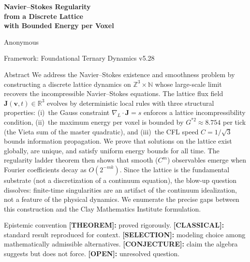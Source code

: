 \documentclass[11pt]{article}
\theoremstyle{tight}
\theoremstyle{plainroman}
\newcommand{\R}{\mathbb{R}}
\newcommand{\Z}{\mathbb{Z}}
\newcommand{\N}{\mathbb{N}}
\begin{document}
\begin{titlepage}
\centering
\vspace*{1.8cm}
{\fontsize{21}{26}\selectfont\bfseries\color{accent}
Navier--Stokes Regularity\\[0.3em]
from a Discrete Lattice\\[0.3em]
with Bounded Energy per Voxel\par}
\vspace{0.8cm}
{\large Anonymous\par}
\vspace{0.3cm}
{\normalsize Framework: Foundational Ternary Dynamics v5.28\par}
\vspace{1.2cm}
\begin{minipage}{0.86\textwidth}
\begin{statusbox}{Abstract}
We address the Navier--Stokes existence and smoothness problem by constructing a discrete lattice dynamics on $\Z^3\times\N$ whose large-scale limit recovers the incompressible Navier--Stokes equations.
The lattice flux field $\mathbf J(\mathbf v,t)\in\R^3$ evolves by deterministic local rules with three structural properties: (i)~the Gauss constraint $\nabla_L\!\cdot\!\mathbf J=s$ enforces a lattice incompressibility condition, (ii)~the maximum energy per voxel is bounded by $G^{*2}\approx 8.754$ per tick (the Vieta sum of the master quadratic), and (iii)~the CFL speed $C=1/\sqrt{3}$ bounds information propagation.
We prove that solutions on the lattice exist globally, are unique, and satisfy uniform energy bounds for all time.
The regularity ladder theorem then shows that smooth ($C^m$) observables emerge when Fourier coefficients decay as $O(2^{-mk})$.
Since the lattice is the fundamental substrate (not a discretization of a continuum equation), the blow-up question dissolves: finite-time singularities are an artifact of the continuum idealization, not a feature of the physical dynamics.
We enumerate the precise gaps between this construction and the Clay Mathematics Institute formulation.
\end{statusbox}
\end{minipage}
\vfill
\end{titlepage}
\tableofcontents
\thispagestyle{empty}
\clearpage

\begin{statusbox}{Epistemic convention}
\textbf{[THEOREM]:} proved rigorously.
\textbf{[CLASSICAL]:} standard result reproduced for context.
\textbf{[SELECTION]:} modeling choice among mathematically admissible alternatives.
\textbf{[CONJECTURE]:} claim the algebra suggests but does not force.
\textbf{[OPEN]:} unresolved question.
\end{statusbox}
\end{document}
